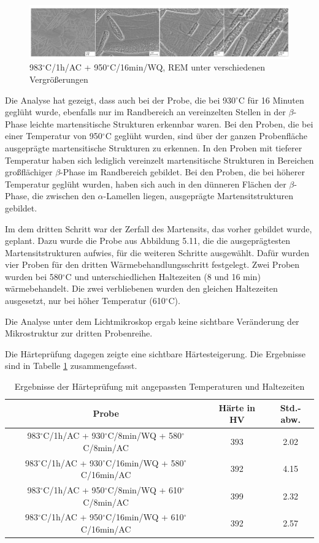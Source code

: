 \begin{figure}[!]
	\centering
	\includegraphics[width=0.9\linewidth]{./Bilder/Abbildung 18}
	\caption[Abbildung 18]{983$^\circ$C/1h/AC + 950$^\circ$C/16min/WQ, REM unter verschiedenen Vergrößerungen}
	\label{fig:abbildung-18}
\end{figure}

Die Analyse hat gezeigt, dass auch bei der Probe, die bei 930$^\circ$C für 16 Minuten geglüht wurde, ebenfalls nur im Randbereich an vereinzelten Stellen in der $\beta$-Phase leichte martensitische Strukturen erkennbar waren.
Bei den Proben, die bei einer Temperatur von 950$^\circ$C geglüht wurden, sind über der ganzen Probenfläche ausgeprägte martensitische Strukturen zu erkennen. In den Proben mit tieferer Temperatur haben sich lediglich vereinzelt martensitische Strukturen in Bereichen großflächiger $\beta$-Phase im Randbereich gebildet. Bei den Proben, die bei höherer Temperatur geglüht wurden, haben sich auch in den dünneren Flächen der $\beta$-Phase, die zwischen den $\alpha$-Lamellen liegen, ausgeprägte Martensitstrukturen gebildet.

Im dem dritten Schritt war der Zerfall des Martensits, das vorher gebildet wurde, geplant. Dazu wurde die Probe aus Abbildung 5.11, die die ausgeprägtesten Martensitstrukturen aufwies, für die weiteren Schritte ausgewählt. 
Dafür wurden vier Proben für den dritten Wärmebehandlungsschritt festgelegt. Zwei Proben wurden bei 580$^\circ$C und unterschiedlichen Haltezeiten (8 und 16 min) wärmebehandelt. Die zwei verbliebenen wurden den gleichen Haltezeiten ausgesetzt, nur bei höher Temperatur (610$^\circ$C).

Die Analyse unter dem Lichtmikroskop ergab keine sichtbare Veränderung der Mikrostruktur zur dritten Probenreihe.

Die Härteprüfung dagegen zeigte eine sichtbare Härtesteigerung. Die Ergebnisse sind in Tabelle \ref{Tabelle 8} zusammengefasst.

\begin{table}[h]
	\centering
	\begin{tabular}{|c|c|c|}
		\hline 
		Probe & Härte in HV &  Std.-abw. \\ 
		\hline 
		983$^\circ$C/1h/AC + 930$^\circ$C/8min/WQ + 580$^\circ$C/8min/AC & 393 & 2.02 \\ 
		\hline 
		983$^\circ$C/1h/AC + 930$^\circ$C/16min/WQ + 580$^\circ$C/16min/AC & 392 & 4.15 \\ 
		\hline 
		983$^\circ$C/1h/AC + 950$^\circ$C/8min/WQ + 610$^\circ$C/8min/AC & 399 & 2.32 \\ 
		\hline 
		983$^\circ$C/1h/AC + 950$^\circ$C/16min/WQ + 610$^\circ$C/16min/AC & 392 & 2.57 \\ 
		\hline 
	\end{tabular} 
	\caption{Ergebnisse der Härteprüfung mit angepassten Temperaturen und Haltezeiten}
	\label{Tabelle 8}
\end{table}

